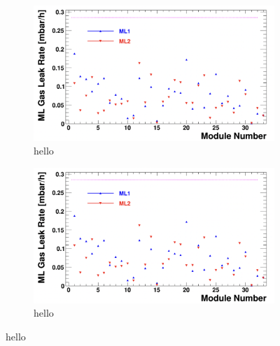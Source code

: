 \documentclass{article}
\begin{document}
\begin{figure}
	\centering	
	\begin{subfigure}[b]{0.3\pdfpagewidth}
		\includegraphics[width=0.3\pdfpagewidth]{ChamberLeakRate.png}
		\caption{hello}
	\end{subfigure}
	\hfill
	\begin{subfigure}[b]{0.3\pdfpagewidth}
		\includegraphics[width=0.3\pdfpagewidth]{ChamberLeakRate.png}
		\caption{hello}
	\end{subfigure}
	\caption{hello}
\end{figure}
\end{document}
